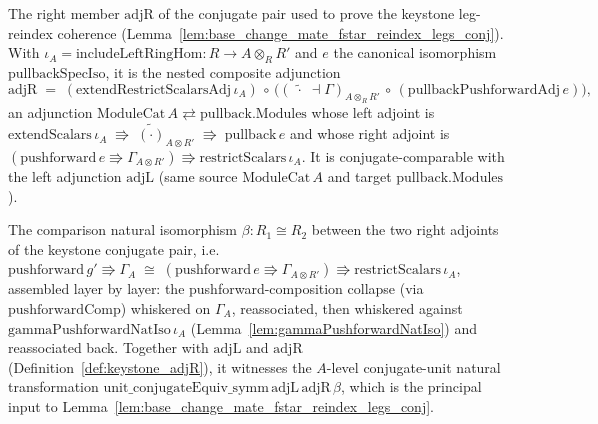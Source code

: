 \begin{definition}

  \label{def:keystone_adjR}
  The right member \(\mathrm{adjR}\) of the conjugate pair used to prove the keystone leg-reindex
  coherence (Lemma~\ref{lem:base_change_mate_fstar_reindex_legs_conj}). With
  \(\iota_A = \mathrm{includeLeftRingHom} : R \to A \otimes_R R'\) and \(e\) the canonical isomorphism
  \(\mathrm{pullbackSpecIso}\), it is the nested composite adjunction
  \[
    \mathrm{adjR} \;=\;
    (\mathrm{extendRestrictScalarsAdj}\,\iota_A)\,\circ\,
    \bigl((\widetilde{\;\cdot\;}\dashv \Gamma)_{A\otimes_R R'}\,\circ\,
    (\mathrm{pullbackPushforwardAdj}\,e)\bigr),
  \]
  an adjunction \(\mathrm{ModuleCat}\,A \rightleftarrows \mathrm{pullback}.\mathrm{Modules}\) whose left
  adjoint is \(\mathrm{extendScalars}\,\iota_A \;\Rrightarrow\; \widetilde{(\cdot)}_{A\otimes R'}
  \;\Rrightarrow\; \mathrm{pullback}\,e\) and whose right adjoint is
  \((\mathrm{pushforward}\,e \Rrightarrow \Gamma_{A\otimes R'}) \Rrightarrow \mathrm{restrictScalars}\,\iota_A\).
  It is conjugate-comparable with the left adjunction \(\mathrm{adjL}\) (same source
  \(\mathrm{ModuleCat}\,A\) and target \(\mathrm{pullback}.\mathrm{Modules}\)).
\end{definition}

\begin{definition}

  \label{def:keystone_beta}
  The comparison natural isomorphism \(\beta : R_1 \cong R_2\) between the two right adjoints of the keystone
  conjugate pair, i.e.\ \(\mathrm{pushforward}\,g' \Rrightarrow \Gamma_A \;\cong\;
  (\mathrm{pushforward}\,e \Rrightarrow \Gamma_{A\otimes R'}) \Rrightarrow \mathrm{restrictScalars}\,\iota_A\),
  assembled layer by layer: the pushforward-composition collapse (via
  \(\mathrm{pushforwardComp}\)) whiskered on \(\Gamma_A\), reassociated, then whiskered against
  \(\mathrm{gammaPushforwardNatIso}\,\iota_A\)
  (Lemma~\ref{lem:gammaPushforwardNatIso}) and reassociated back. Together with \(\mathrm{adjL}\) and
  \(\mathrm{adjR}\) (Definition~\ref{def:keystone_adjR}), it witnesses the \(A\)-level conjugate-unit
  natural transformation \(\mathrm{unit\_conjugateEquiv\_symm}\,\mathrm{adjL}\,\mathrm{adjR}\,\beta\),
  which is the principal input to Lemma~\ref{lem:base_change_mate_fstar_reindex_legs_conj}.
\end{definition}

